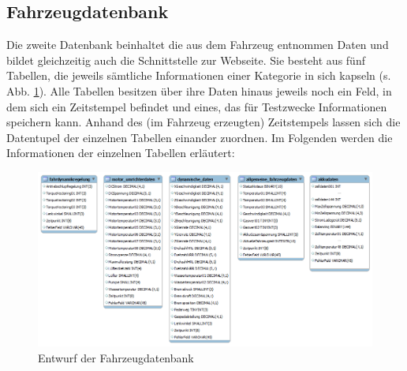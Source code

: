 \documentclass[fontsize = 12pt, paper = a4]{scrreprt}
\begin{document}
\subsection{Fahrzeugdatenbank}

Die zweite Datenbank beinhaltet die aus dem Fahrzeug entnommen Daten und bildet gleichzeitig auch die Schnittstelle zur Webseite. Sie besteht aus fünf Tabellen, die jeweils sämtliche Informationen einer Kategorie in sich kapseln (s. Abb. \ref{Fahrzeugdatenbank}). Alle Tabellen besitzen über ihre Daten hinaus jeweils noch ein Feld, in dem sich ein Zeitstempel befindet und eines, das für Testzwecke Informationen speichern kann. Anhand des (im Fahrzeug erzeugten)  Zeitstempels lassen sich die Datentupel der einzelnen Tabellen einander zuordnen. Im Folgenden werden die Informationen der einzelnen Tabellen erläutert:

\begin{figure}[h]
\centering
\includegraphics[scale = 0.43]{fahrzeugdatenbank} %
\caption[Entwurf Fahrzeugdatenbank]{Entwurf der Fahrzeugdatenbank}
\label{Fahrzeugdatenbank}
\end{figure} 
\end{document}
